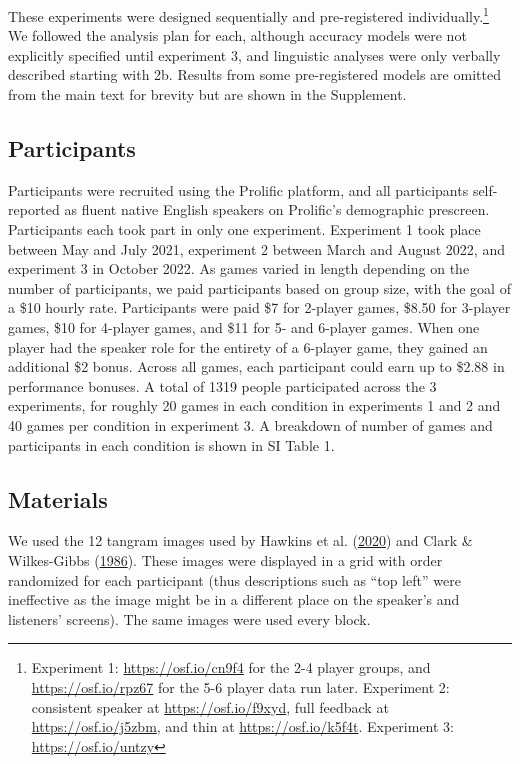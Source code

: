 \documentclass[
  english,
]{article}
\begin{document}
These experiments were designed sequentially and pre-registered individually.\footnote{Experiment 1: \url{https://osf.io/cn9f4} for the 2-4 player groups, and \url{https://osf.io/rpz67} for the 5-6 player data run later. Experiment 2: consistent speaker at \url{https://osf.io/f9xyd}, full feedback at \url{https://osf.io/j5zbm}, and thin at \url{https://osf.io/k5f4t}. Experiment 3: \url{https://osf.io/untzy}} We followed the analysis plan for each, although accuracy models were not explicitly specified until experiment 3, and linguistic analyses were only verbally described starting with 2b. Results from some pre-registered models are omitted from the main text for brevity but are shown in the Supplement.

\hypertarget{participants}{%
\subsection{Participants}\label{participants}}

Participants were recruited using the Prolific platform, and all participants self-reported as fluent native English speakers on Prolific's demographic prescreen. Participants each took part in only one experiment. Experiment 1 took place between May and July 2021, experiment 2 between March and August 2022, and experiment 3 in October 2022. As games varied in length depending on the number of participants, we paid participants based on group size, with the goal of a \$10 hourly rate. Participants were paid \$7 for 2-player games, \$8.50 for 3-player games, \$10 for 4-player games, and \$11 for 5- and 6-player games. When one player had the speaker role for the entirety of a 6-player game, they gained an additional \$2 bonus. Across all games, each participant could earn up to \$2.88 in performance bonuses. A total of 1319 people participated across the 3 experiments, for roughly 20 games in each condition in experiments 1 and 2 and 40 games per condition in experiment 3. A breakdown of number of games and participants in each condition is shown in SI Table 1.

\hypertarget{materials}{%
\subsection{Materials}\label{materials}}

We used the 12 tangram images used by Hawkins et al. (\protect\hyperlink{ref-hawkins2020}{2020}) and Clark \& Wilkes-Gibbs (\protect\hyperlink{ref-clark1986}{1986}). These images were displayed in a grid with order randomized for each participant (thus descriptions such as ``top left'' were ineffective as the image might be in a different place on the speaker's and listeners' screens). The same images were used every block.
\end{document}
